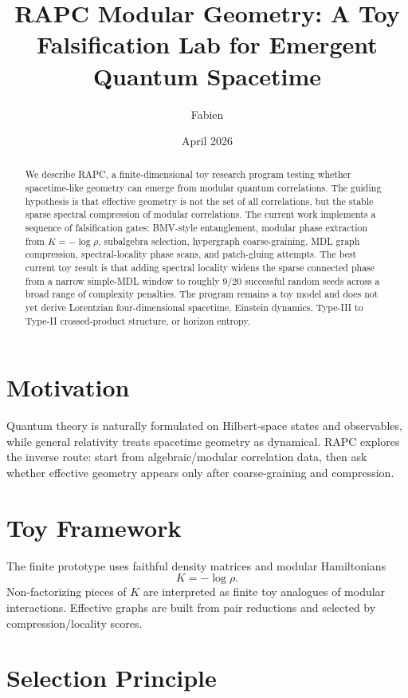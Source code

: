 \documentclass[11pt]{article}
\title{RAPC Modular Geometry: A Toy Falsification Lab for Emergent Quantum Spacetime}
\author{Fabien}
\date{April 2026}
\begin{document}
\maketitle

\begin{abstract}
We describe RAPC, a finite-dimensional toy research program testing whether spacetime-like geometry can emerge from modular quantum correlations. The guiding hypothesis is that effective geometry is not the set of all correlations, but the stable sparse spectral compression of modular correlations. The current work implements a sequence of falsification gates: BMV-style entanglement, modular phase extraction from $K=-\log\rho$, subalgebra selection, hypergraph coarse-graining, MDL graph compression, spectral-locality phase scans, and patch-gluing attempts. The best current toy result is that adding spectral locality widens the sparse connected phase from a narrow simple-MDL window to roughly $9/20$ successful random seeds across a broad range of complexity penalties. The program remains a toy model and does not yet derive Lorentzian four-dimensional spacetime, Einstein dynamics, Type-III to Type-II crossed-product structure, or horizon entropy.
\end{abstract}

\section{Motivation}

Quantum theory is naturally formulated on Hilbert-space states and observables, while general relativity treats spacetime geometry as dynamical. RAPC explores the inverse route: start from algebraic/modular correlation data, then ask whether effective geometry appears only after coarse-graining and compression.

\section{Toy Framework}

The finite prototype uses faithful density matrices and modular Hamiltonians
\begin{equation}
K = -\log \rho.
\end{equation}
Non-factorizing pieces of $K$ are interpreted as finite toy analogues of modular interactions. Effective graphs are built from pair reductions and selected by compression/locality scores.

\section{Selection Principle}
\end{document}
